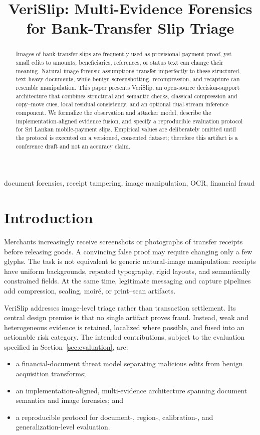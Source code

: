 \documentclass[conference]{IEEEtran}
\title{VeriSlip: Multi-Evidence Forensics for Bank-Transfer Slip Triage}
\author{\IEEEauthorblockN{Anonymous Authors}}
\begin{document}
\maketitle

\begin{abstract}
Images of bank-transfer slips are frequently used as provisional payment proof,
yet small edits to amounts, beneficiaries, references, or status text can change
their meaning. Natural-image forensic assumptions transfer imperfectly to these
structured, text-heavy documents, while benign screenshotting, recompression,
and recapture can resemble manipulation. This paper presents VeriSlip, an
open-source decision-support architecture that combines structural and semantic
checks, classical compression and copy--move cues, local residual consistency,
and an optional dual-stream inference component. We formalize the observation
and attacker model, describe the implementation-aligned evidence fusion, and
specify a reproducible evaluation protocol for Sri Lankan mobile-payment slips.
Empirical values are deliberately omitted until the protocol is executed on a
versioned, consented dataset; therefore this artifact is a conference draft and
not an accuracy claim.
\end{abstract}

\begin{IEEEkeywords}
document forensics, receipt tampering, image manipulation, OCR, financial fraud
\end{IEEEkeywords}

\section{Introduction}
Merchants increasingly receive screenshots or photographs of transfer receipts
before releasing goods. A convincing false proof may require changing only a few
glyphs. The task is not equivalent to generic natural-image manipulation:
receipts have uniform backgrounds, repeated typography, rigid layouts, and
semantically constrained fields. At the same time, legitimate messaging and
capture pipelines add compression, scaling, moir\'e, or print--scan artifacts.

VeriSlip addresses image-level triage rather than transaction settlement. Its
central design premise is that no single artifact proves fraud. Instead, weak and
heterogeneous evidence is retained, localized where possible, and fused into an
actionable risk category. The intended contributions, subject to the evaluation
specified in Section~\ref{sec:evaluation}, are:
\begin{itemize}
  \item a financial-document threat model separating malicious edits from benign
  acquisition transforms;
  \item an implementation-aligned, multi-evidence architecture spanning document
  semantics and image forensics; and
  \item a reproducible protocol for document-, region-, calibration-, and
  generalization-level evaluation.
\end{itemize}
\end{document}
